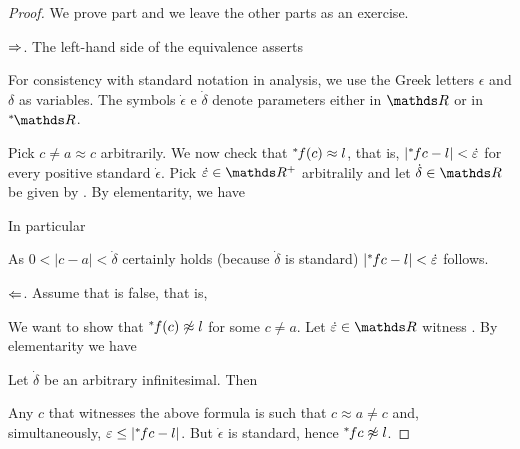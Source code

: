 \begin{proof}
We prove part  and we leave the other parts as an exercise.

$\Rightarrow$.
The left-hand side of the equivalence  asserts



For consistency with standard notation in analysis, we use the Greek letters $\epsilon$ and $\delta$ as variables.
The symbols $\dot\epsilon$ e $\dot\delta$ denote parameters either in $\RR$ or in $\nsR$.

Pick $c\neq a\approx c$ arbitrarily.
We now check that ${}^*\kern-.2ex f(c)\approx l$, that is, $|{}^*\kern-.2ex fc-l|<\dot{\varepsilon}$ for every positive standard $\dot\epsilon$.
Pick $\dot\epsilon\in\RR^+$ arbitralily and let $\dot\delta\in\RR$ be given by .
By elementarity, we have


In particular

\ceq{\hfill\ns\RR}{\models}{\phantom{\A\,\epsilon>0\ \E\,\delta>0\ \A x\ \Big[}0<|c-a|<\dot\delta\ \ \imp\ \ |fc-l|<\dot\epsilon.}

As $0<|c-a|<\dot\delta$ certainly holds (because $\dot\delta$ is standard) $|{}^*\kern-.2ex fc-l|<\dot{\varepsilon}$ follows.


$\Leftarrow$.
Assume that  is false, that is,


We want to show that ${}^*\kern-.2ex f(c)\not\approx l$ for some $c\neq a$.
Let $\dot\epsilon\in\RR$ witness .
By elementarity we have


Let $\dot\delta$ be an arbitrary infinitesimal.
Then 


Any $c$ that witnesses the above formula is such that $c\approx a\neq c$ and, simultaneously, $\varepsilon\le |{}^*\kern-.2ex fc-l|$.
But $\dot\epsilon$ is standard, hence ${}^*\kern-.2ex fc\not\approx l$.
\end{proof}


